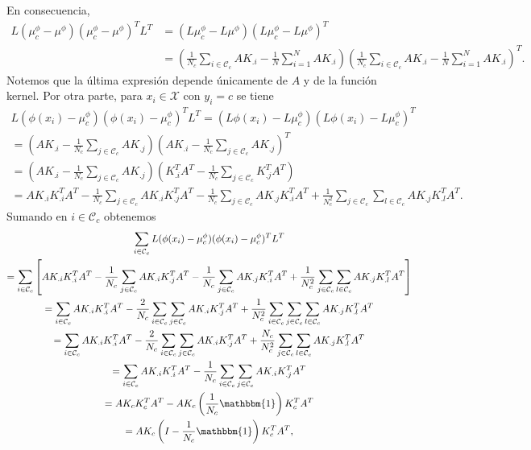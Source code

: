 \documentclass{book}
\begin{document}
En consecuencia,
\begin{align*}
	L(\mu_c^{\phi} - \mu^{\phi})(\mu_c^{\phi} - \mu^{\phi})^TL^T &= (L\mu_c^{\phi} - L\mu^{\phi})(L\mu_c^{\phi} - L\mu^{\phi})^T \\
									 &=  \left( \frac{1}{N_c}\sum_{i \in \mathcal{C}_c} AK_{.i} - \frac{1}{N}\sum_{i=1}^N AK_{.i} \right)\left( \frac{1}{N_c}\sum_{i \in \mathcal{C}_c} AK_{.i} - \frac{1}{N}\sum_{i=1}^N AK_{.i} \right)^T.
\end{align*}
Notemos que la última expresión depende únicamente de $A$ y de la función kernel. Por otra parte, para $x_i \in \mathcal{X}$ con $y_i = c$ se tiene
\begin{multline*}
	L(\phi(x_i) - \mu_c^{\phi})(\phi(x_i) - \mu_c^{\phi})^TL^T = (L\phi(x_i) - L\mu_c^{\phi})(L\phi(x_i) - L\mu_c^{\phi})^T \\
									 = \left(AK_{.i} - \frac{1}{N_c}\sum_{j \in \mathcal{C}_c} AK_{.j} \right)\left(AK_{.i} - \frac{1}{N_c}\sum_{j \in \mathcal{C}_c} AK_{.j} \right)^T \\
									 = \left(AK_{.i} - \frac{1}{N_c}\sum_{j \in \mathcal{C}_c} AK_{.j} \right)\left(K_{.i}^TA^T - \frac{1}{N_c}\sum_{j \in \mathcal{C}_c} K_{.j}^TA^T \right) \\
									 = AK_{.i}K_{.i}^TA^T - \frac{1}{N_c}\sum_{j\in \mathcal{C}_c}AK_{.i}K_{.j}^TA^T - \frac{1}{N_c}\sum_{j\in \mathcal{C}_c}AK_{.j}K_{.i}^TA^T + \frac{1}{N_c^2}\sum_{j \in \mathcal{C}_c}\sum_{l \in \mathcal{C}_c}AK_{.j}K_{.l}^TA^T.
\end{multline*}
Sumando en $i \in \mathcal{C}_c$ obtenemos
\begin{multline*}
	\sum_{i\in\mathcal{C}_c}L(\phi(x_i) - \mu_c^{\phi})(\phi(x_i) - \mu_c^{\phi})^TL^T \\
	= \sum_{i \in \mathcal{C}_c}\left[AK_{.i}K_{.i}^TA^T - \frac{1}{N_c}\sum_{j\in \mathcal{C}_c}AK_{.i}K_{.j}^TA^T - \frac{1}{N_c}\sum_{j\in \mathcal{C}_c}AK_{.j}K_{.i}^TA^T + \frac{1}{N_c^2}\sum_{j \in \mathcal{C}_c}\sum_{l \in \mathcal{C}_c}AK_{.j}K_{.l}^TA^T\right] \\
			= \sum_{i \in \mathcal{C}_c}AK_{.i}K_{.i}^TA^T - \frac{2}{N_c}\sum_{i \in \mathcal{C}_c}\sum_{j \in \mathcal{C}_c}AK_{.i}K_{.j}^TA^T + \frac{1}{N_c^2}\sum_{i \in \mathcal{C}_c}\sum_{j \in \mathcal{C}_c}\sum_{l \in \mathcal{C}_c}AK_{.j}K_{.l}^TA^T \\
			= \sum_{i \in \mathcal{C}_c}AK_{.i}K_{.i}^TA^T - \frac{2}{N_c}\sum_{i \in \mathcal{C}_c}\sum_{j \in \mathcal{C}_c}AK_{.i}K_{.j}^TA^T + \frac{N_c}{N_c^2}\sum_{j \in \mathcal{C}_c}\sum_{l \in \mathcal{C}_c}AK_{.j}K_{.l}^TA^T \\
			= \sum_{i \in \mathcal{C}_c}AK_{.i}K_{.i}^TA^T - \frac{1}{N_c}\sum_{i \in \mathcal{C}_c}\sum_{j \in \mathcal{C}_c}AK_{.i}K_{.j}^TA^T \\
			= AK_cK_c^TA^T - AK_c\left(\frac{1}{N_c}\mathbbm{1}\right)K_c^TA^T \\
			= AK_c\left(I - \frac{1}{N_c}\mathbbm{1}\right)K_c^TA^T,
\end{multline*}
\end{document}
